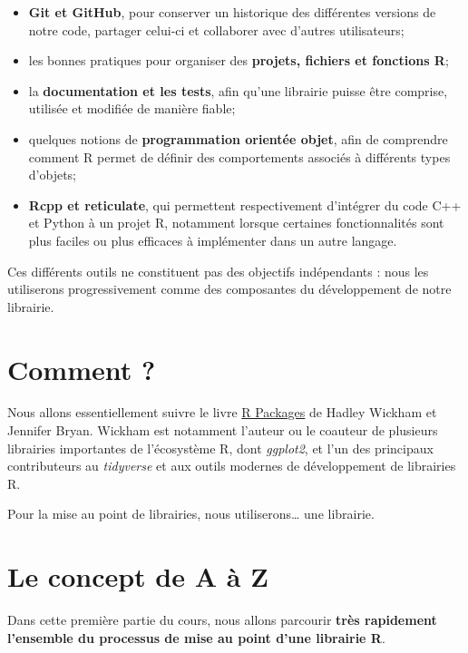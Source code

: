\documentclass[
  letterpaper,
  DIV=11,
  numbers=noendperiod]{scrreprt}
\providecommand{\tightlist}{%
  \setlength{\itemsep}{0pt}\setlength{\parskip}{0pt}}\usepackage{longtable,booktabs,array}
\begin{document}
\begin{itemize}
\tightlist
\item
  \textbf{Git et GitHub}, pour conserver un historique des différentes
  versions de notre code, partager celui-ci et collaborer avec d'autres
  utilisateurs;
\item
  les bonnes pratiques pour organiser des \textbf{projets, fichiers et
  fonctions R};
\item
  la \textbf{documentation et les tests}, afin qu'une librairie puisse
  être comprise, utilisée et modifiée de manière fiable;
\item
  quelques notions de \textbf{programmation orientée objet}, afin de
  comprendre comment R permet de définir des comportements associés à
  différents types d'objets;
\item
  \textbf{Rcpp et reticulate}, qui permettent respectivement d'intégrer
  du code C++ et Python à un projet R, notamment lorsque certaines
  fonctionnalités sont plus faciles ou plus efficaces à implémenter dans
  un autre langage.
\end{itemize}

Ces différents outils ne constituent pas des objectifs indépendants :
nous les utiliserons progressivement comme des composantes du
développement de notre librairie.

\section*{Comment ?}\label{comment}


Nous allons essentiellement suivre le livre \href{https://r-pkgs.org}{R
Packages} de Hadley Wickham et Jennifer Bryan. Wickham est notamment
l'auteur ou le coauteur de plusieurs librairies importantes de
l'écosystème R, dont \emph{ggplot2}, et l'un des principaux
contributeurs au \emph{tidyverse} et aux outils modernes de
développement de librairies R.

Pour la mise au point de librairies, nous utiliserons\ldots{} une
librairie.

\section{Le concept de A à Z}\label{le-concept-de-a-uxe0-z}

Dans cette première partie du cours, nous allons parcourir \textbf{très
rapidement l'ensemble du processus de mise au point d'une librairie R}.
\end{document}
